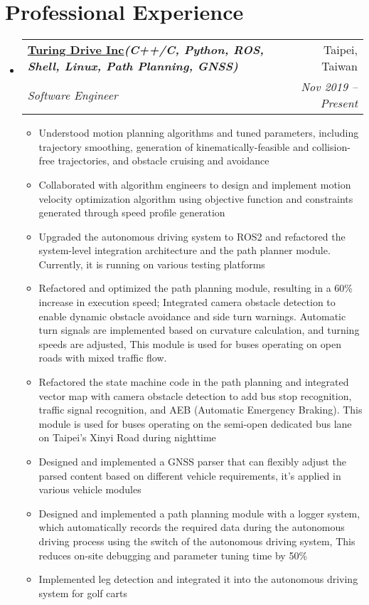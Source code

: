 \documentclass[letterpaper,11pt]{article}
\makeatletter
\newcommand{\resumeItem}[1]{
  \item\small{
    {#1 \vspace{-2pt}}
  }
}
\newcommand{\resumeSubheading}[4]{
  \vspace{-2pt}\item
    \begin{tabular*}{0.97\textwidth}[t]{l@{\extracolsep{\fill}}r}
      \textbf{#1} & #2 \\
      \textit{\small#3} & \textit{\small #4} \\
    \end{tabular*}\vspace{-7pt}
}
\newcommand{\resumeSubHeadingListStart}{\begin{itemize}[leftmargin=0.15in, label={}]}
\newcommand{\resumeSubHeadingListEnd}{\end{itemize}}
\newcommand{\resumeItemListStart}{\begin{itemize}}
\newcommand{\resumeItemListEnd}{\end{itemize}\vspace{-5pt}}
\makeatother
\begin{document}
\section{\textbf{Professional Experience}}
  \vspace{3pt}
  \resumeSubHeadingListStart

    \resumeSubheading 
      {\href{https://turing-drive.com/zh/home-zh/}{\color{blue}Turing Drive Inc}\emph{\scriptsize{(C++/C, Python, ROS, Shell, Linux, Path Planning, GNSS)}}}{Taipei, Taiwan}
      {Software Engineer}{Nov 2019 -- Present}
      \resumeItemListStart
      \resumeItem{Understood motion planning algorithms and tuned parameters, including trajectory smoothing, generation of kinematically-feasible and collision-free trajectories, and obstacle cruising and avoidance}
      \resumeItem{Collaborated with algorithm engineers to design and implement motion velocity optimization algorithm using objective function and constraints generated through speed profile generation}
      \resumeItem{Upgraded the autonomous driving system to ROS2 and refactored the system-level integration architecture and the path planner module. Currently, it is running on various testing platforms}
      \resumeItem{Refactored and optimized the path planning module, resulting in a 60\% increase in execution speed; Integrated camera obstacle detection to enable dynamic obstacle avoidance and side turn warnings. Automatic turn signals are implemented based on curvature calculation, and turning speeds are adjusted,  This module is used for buses operating on open roads with mixed traffic flow.}
      \resumeItem{Refactored the state machine code in the path planning and integrated vector map with camera obstacle detection to add bus stop recognition, traffic signal recognition, and AEB (Automatic Emergency Braking). This module is used for buses operating on the semi-open dedicated bus lane on Taipei's Xinyi Road during nighttime}
      \resumeItem{Designed and implemented a GNSS parser that can flexibly adjust the parsed content based on different vehicle requirements, it's applied in various vehicle modules}
      \resumeItem{Designed and implemented a path planning module with a logger system, which automatically records the required data during the autonomous driving process using the switch of the autonomous driving system, This reduces on-site debugging and parameter tuning time by 50\%}
      \resumeItem{Implemented leg detection and integrated it into the autonomous driving system for golf carts}
    \resumeItemListEnd
  \resumeSubHeadingListEnd
  
\end{document}
